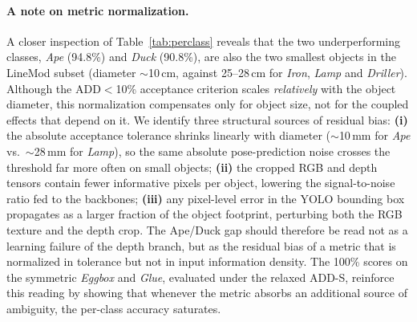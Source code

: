 \paragraph{A note on metric normalization.}
A closer inspection of Table~\ref{tab:perclass} reveals that the two underperforming classes, \textit{Ape} (94.8\%) and \textit{Duck} (90.8\%), are also the two smallest objects in the LineMod subset (diameter $\sim$10\,cm, against 25--28\,cm for \textit{Iron}, \textit{Lamp} and \textit{Driller}). Although the ADD$<$10\% acceptance criterion scales \emph{relatively} with the object diameter, this normalization compensates only for object size, not for the coupled effects that depend on it. We identify three structural sources of residual bias: \textbf{(i)} the absolute acceptance tolerance shrinks linearly with diameter ($\sim$10\,mm for \textit{Ape} vs.\ $\sim$28\,mm for \textit{Lamp}), so the same absolute pose-prediction noise crosses the threshold far more often on small objects; \textbf{(ii)} the cropped RGB and depth tensors contain fewer informative pixels per object, lowering the signal-to-noise ratio fed to the backbones; \textbf{(iii)} any pixel-level error in the YOLO bounding box propagates as a larger fraction of the object footprint, perturbing both the RGB texture and the depth crop. The Ape/Duck gap should therefore be read not as a learning failure of the depth branch, but as the residual bias of a metric that is normalized in tolerance but not in input information density. The 100\% scores on the symmetric \textit{Eggbox} and \textit{Glue}, evaluated under the relaxed ADD-S, reinforce this reading by showing that whenever the metric absorbs an additional source of ambiguity, the per-class accuracy saturates.

